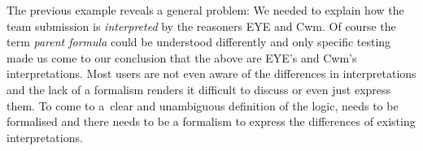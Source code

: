 The previous example reveals a general problem: 
We needed to explain how the \wwwc team submission is \emph{interpreted} by the reasoners EYE and Cwm.
Of course the term \emph{parent formula} could be understood differently 
and only
specific testing made us come to our conclusion that the above are EYE's and Cwm's interpretations. %
Most users are not even aware of the differences in interpretations and the lack of a formalism renders it difficult to discuss or even just express them. %
To come to a~clear and unambiguous definition of the logic, 
\nthree needs to be formalised and there needs to be a formalism to express the differences of existing interpretations. 
% 
% 
% 
% 
% 
% 
